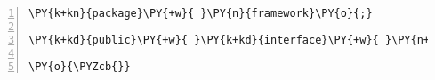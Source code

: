 \begin{Verbatim}[commandchars=\\\{\},numbers=left,firstnumber=1,stepnumber=1,frame=single,fontsize=\small]
\PY{k+kn}{package}\PY{+w}{ }\PY{n}{framework}\PY{o}{;}

\PY{k+kd}{public}\PY{+w}{ }\PY{k+kd}{interface}\PY{+w}{ }\PY{n+nc}{Output}\PY{+w}{ }\PY{o}{\PYZob{}}

\PY{o}{\PYZcb{}}
\end{Verbatim}
